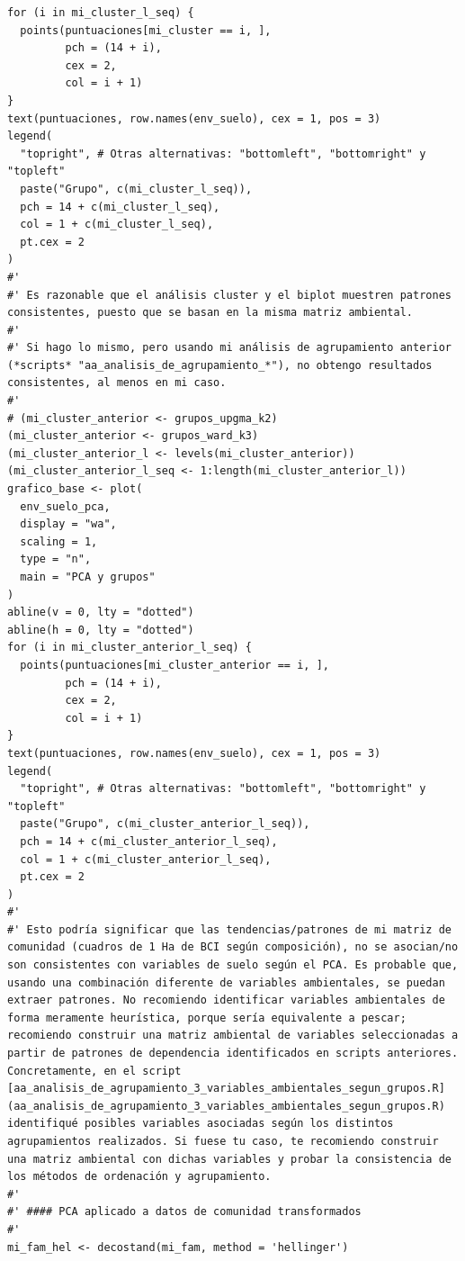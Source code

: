 \documentclass[11pt,]{article}
\begin{document}
\begin{verbatim}
for (i in mi_cluster_l_seq) {
  points(puntuaciones[mi_cluster == i, ],
         pch = (14 + i),
         cex = 2,
         col = i + 1)
}
text(puntuaciones, row.names(env_suelo), cex = 1, pos = 3)
legend(
  "topright", # Otras alternativas: "bottomleft", "bottomright" y "topleft"
  paste("Grupo", c(mi_cluster_l_seq)),
  pch = 14 + c(mi_cluster_l_seq),
  col = 1 + c(mi_cluster_l_seq),
  pt.cex = 2
)
#' 
#' Es razonable que el análisis cluster y el biplot muestren patrones consistentes, puesto que se basan en la misma matriz ambiental.
#' 
#' Si hago lo mismo, pero usando mi análisis de agrupamiento anterior (*scripts* "aa_analisis_de_agrupamiento_*"), no obtengo resultados consistentes, al menos en mi caso.
#' 
# (mi_cluster_anterior <- grupos_upgma_k2)
(mi_cluster_anterior <- grupos_ward_k3)
(mi_cluster_anterior_l <- levels(mi_cluster_anterior))
(mi_cluster_anterior_l_seq <- 1:length(mi_cluster_anterior_l))
grafico_base <- plot(
  env_suelo_pca,
  display = "wa",
  scaling = 1,
  type = "n",
  main = "PCA y grupos"
)
abline(v = 0, lty = "dotted")
abline(h = 0, lty = "dotted")
for (i in mi_cluster_anterior_l_seq) {
  points(puntuaciones[mi_cluster_anterior == i, ],
         pch = (14 + i),
         cex = 2,
         col = i + 1)
}
text(puntuaciones, row.names(env_suelo), cex = 1, pos = 3)
legend(
  "topright", # Otras alternativas: "bottomleft", "bottomright" y "topleft"
  paste("Grupo", c(mi_cluster_anterior_l_seq)),
  pch = 14 + c(mi_cluster_anterior_l_seq),
  col = 1 + c(mi_cluster_anterior_l_seq),
  pt.cex = 2
)
#' 
#' Esto podría significar que las tendencias/patrones de mi matriz de comunidad (cuadros de 1 Ha de BCI según composición), no se asocian/no son consistentes con variables de suelo según el PCA. Es probable que, usando una combinación diferente de variables ambientales, se puedan extraer patrones. No recomiendo identificar variables ambientales de forma meramente heurística, porque sería equivalente a pescar; recomiendo construir una matriz ambiental de variables seleccionadas a partir de patrones de dependencia identificados en scripts anteriores. Concretamente, en el script [aa_analisis_de_agrupamiento_3_variables_ambientales_segun_grupos.R](aa_analisis_de_agrupamiento_3_variables_ambientales_segun_grupos.R) identifiqué posibles variables asociadas según los distintos agrupamientos realizados. Si fuese tu caso, te recomiendo construir una matriz ambiental con dichas variables y probar la consistencia de los métodos de ordenación y agrupamiento.
#' 
#' #### PCA aplicado a datos de comunidad transformados
#' 
mi_fam_hel <- decostand(mi_fam, method = 'hellinger')

\end{verbatim}
\end{document}
